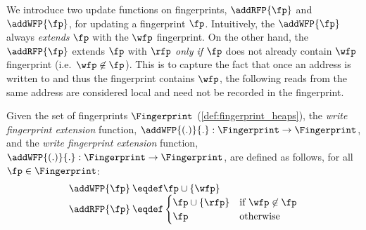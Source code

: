 We introduce two update functions on fingerprints, $\addRFP{\fp}$ and $\addWFP{\fp}$, for updating a fingerprint $\fp$. Intuitively, the $\addWFP{\fp}$ always \emph{extends} $\fp$ with the $\wfp$ fingerprint. On the other hand, the $\addRFP{\fp}$ extends $\fp$ with $\rfp$ \emph{only if} $\fp$ does not already contain $\wfp$ fingerprint (i.e.~$\wfp \not\in \fp$). This is to capture the fact that once an address is written to and thus the fingerprint contains $\wfp$, the following reads from the same address are considered local and need not be recorded in the fingerprint.
%
%
%
\begin{definition}
Given the set of fingerprints $\Fingerprint$ (\ref{def:fingerprint_heaps}), the \emph{write fingerprint extension} function, $\addWFP{(.)}{.}: \Fingerprint \rightarrow \Fingerprint$, and the \emph{write fingerprint extension} function, $\addWFP{(.)}{.}: \Fingerprint \rightarrow \Fingerprint$, are defined as follows, for all $\fp \in \Fingerprint$:
\[
\begin{array}{r @{\hspace{2pt}} l}
	\addWFP{\fp} & \eqdef \fp \cup \{\wfp\} \\
	\addRFP{\fp} & \eqdef
	\begin{cases}
		\fp \cup \{\rfp\}  & \text{if } \wfp \not\in \fp \\
		\fp & \text{otherwise}
	\end{cases}
\end{array}	
\]
\end{definition}

